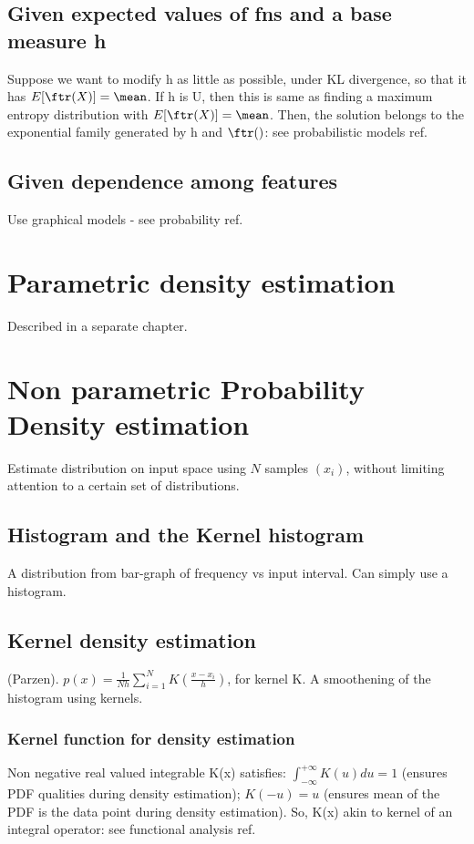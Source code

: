 \documentclass[oneside, article]{memoir}
\begin{document}
\subsection{Given expected values of fns  and a base measure h}
Suppose we want to modify h as little as possible, under KL divergence, so that it has $E[\ftr(X)] = \mean$. If h is U, then this is same as finding a maximum entropy distribution with $E[\ftr(X)] = \mean$. Then, the solution belongs to the exponential family generated by h and $\ftr()$: see probabilistic models ref.

\subsection{Given dependence among features}
Use graphical models - see probability ref.

\section{Parametric density estimation}
Described in a separate chapter.

\section{Non parametric Probability Density estimation}
Estimate distribution on input space using $N$ samples $(x_{i})$, without limiting attention to a certain set of distributions.

\subsection{Histogram and the Kernel histogram}
A distribution from bar-graph of frequency vs input interval. Can simply use a histogram.

\subsection{Kernel density estimation}
(Parzen). $p(x) = \frac{1}{Nh}\sum_{i=1}^{N} K(\frac{x-x_{i}}{h})$, for kernel K. A smoothening of the histogram using kernels.

\subsubsection{Kernel function for density estimation}
Non negative real valued integrable K(x) satisfies: $\int_{-\infty}^{+\infty}K(u)du = 1$ (ensures PDF qualities during density estimation); $K(-u) = u$ (ensures mean of the PDF is the data point during density estimation). So, K(x) akin to kernel of an integral operator: see functional analysis ref.
\end{document}
